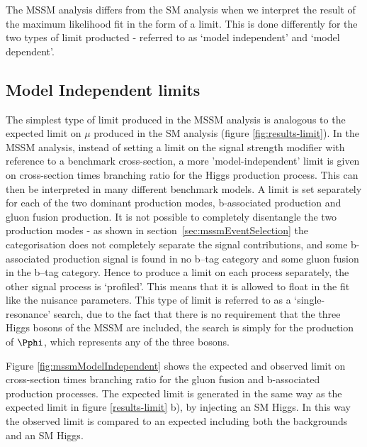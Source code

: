 The \ac{MSSM} analysis differs from the \ac{SM} analysis when we 
interpret the result of the maximum likelihood fit in the form of a limit. This
is done differently for the two types of limit producted - referred to as `model 
independent' and `model dependent'. 

\subsection{Model Independent limits}
\label{sec:modelindependent}

The simplest type of limit produced in the \ac{MSSM} analysis is analogous to the 
expected limit on $\mu$ produced in the \ac{SM} analysis (figure
\ref{fig:results-limit}). In the \ac{MSSM} analysis, instead of setting a limit
on the signal strength modifier with reference to a benchmark cross-section, a
more 'model-independent' limit is given on cross-section times branching ratio
for the Higgs production process. This can then be interpreted in many different
benchmark models. A limit is set separately for each of the two dominant production modes,
b-associated production and gluon fusion production. It is not possible to
completely disentangle the two production modes - as shown in
section~\ref{sec:mssmEventSelection} the categorisation does not completely
separate the signal contributions, and some b-associated production signal is
found in no b--tag category and some gluon fusion in the b--tag category. Hence
to produce a limit on each process separately, the other signal process is
`profiled'. This means that it is allowed to float in the fit like the nuisance
parameters. This type of limit is referred to as a `single-resonance' search,
due to the fact that there is no requirement that the three Higgs bosons of the
\ac{MSSM} are included, the search is simply for the production of $\Pphi$,
which represents any of the three bosons.

Figure \ref{fig:mssmModelIndependent} shows the expected and observed limit on
cross-section times branching ratio for the gluon fusion and b-associated
production processes. The expected limit is generated in the same way as the
expected limit in figure \ref{results-limit} b), by injecting an \ac{SM} Higgs.
In this way the observed limit is compared to an expected including both the
backgrounds and an \ac{SM} Higgs. 


